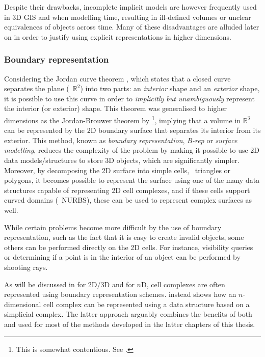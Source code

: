 Despite their drawbacks, incomplete implicit models are however frequently used in 3D GIS and when modelling time, resulting in ill-defined volumes or unclear equivalences of objects across time.
Many of these disadvantages are alluded later on in order to justify using explicit representations in higher dimensions.

\subsubsection{Boundary representation}

Considering the Jordan curve theorem \citep{Jordan87}, which states that a closed curve separates the plane (\ie\ $\mathbb{R}^2$) into two parts: an \emph{interior} shape and an \emph{exterior} shape, it is possible to use this curve in order to \emph{implicitly but unambiguously} represent the interior (or exterior) shape.
This theorem was generalised to higher dimensions as the Jordan-Brouwer theorem by \citet{Lebesgue11,Brouwer11}\footnote{This is somewhat contentious. See \citet[Ch.~5]{van-Dalen13}.}, implying that a volume in $\mathbb{R}^3$ can be represented by the 2D boundary surface that separates its interior from its exterior.
This method, known as \emph{boundary representation}, \emph{B-rep} or \emph{surface modelling}, reduces the complexity of the problem by making it possible to use 2D data models/structures to store 3D objects, which are significantly simpler.
Moreover, by decomposing the 2D surface into simple cells, \eg\ triangles or polygons, it becomes possible to represent the surface using one of the many data structures capable of representing 2D cell complexes, and if these cells support curved domains (\eg\ NURBS), these can be used to represent complex surfaces as well.

While certain problems become more difficult by the use of boundary representation, such as the fact that it is easy to create invalid objects, some others can be performed directly on the 2D cells.
For instance, visibility queries or determining if a point is in the interior of an object can be performed by shooting rays.

As will be discussed in  for 2D/3D and  for $n$D, cell complexes are often represented using boundary representation schemes.
 instead shows how an $n$-dimensional cell complex can be represented using a data structure based on a simplicial complex.
The latter approach arguably combines the benefits of both and used for most of the methods developed in the latter chapters of this thesis.

